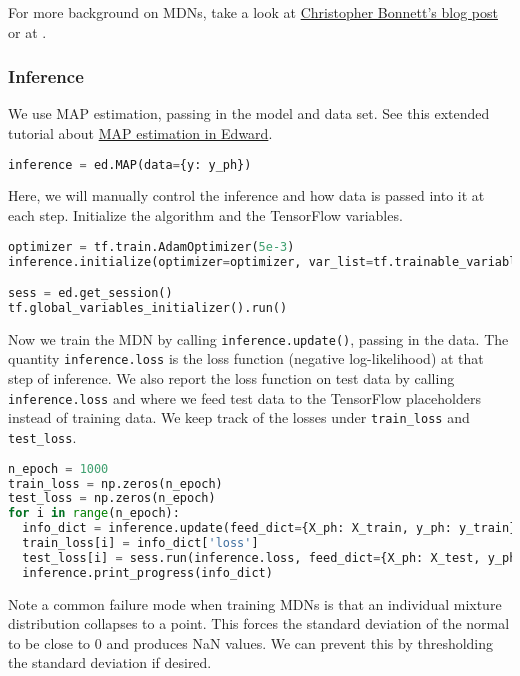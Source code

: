For more background on MDNs, take a look at
\href{http://cbonnett.github.io/MDN.html}{Christopher Bonnett's blog
post} or at \citet{bishop1994mixture}.

\subsubsection{Inference}

We use MAP estimation, passing in the model and data set.
See this extended tutorial about
\href{/tutorials/map}{MAP estimation in Edward}.

\begin{lstlisting}[language=Python]
inference = ed.MAP(data={y: y_ph})
\end{lstlisting}

Here, we will manually control the inference and how data is passed
into it at each step.
Initialize the algorithm and the TensorFlow variables.

\begin{lstlisting}[language=Python]
optimizer = tf.train.AdamOptimizer(5e-3)
inference.initialize(optimizer=optimizer, var_list=tf.trainable_variables())

sess = ed.get_session()
tf.global_variables_initializer().run()
\end{lstlisting}

Now we train the MDN by calling \texttt{inference.update()}, passing
in the data. The quantity \texttt{inference.loss} is the
loss function (negative log-likelihood) at that step of inference. We
also report the loss function on test data by calling
\texttt{inference.loss} and where we feed test data to the TensorFlow
placeholders instead of training data.
We keep track of the losses under \texttt{train\_loss} and \texttt{test\_loss}.

\begin{lstlisting}[language=Python]
n_epoch = 1000
train_loss = np.zeros(n_epoch)
test_loss = np.zeros(n_epoch)
for i in range(n_epoch):
  info_dict = inference.update(feed_dict={X_ph: X_train, y_ph: y_train})
  train_loss[i] = info_dict['loss']
  test_loss[i] = sess.run(inference.loss, feed_dict={X_ph: X_test, y_ph: y_test})
  inference.print_progress(info_dict)
\end{lstlisting}

Note a common failure mode when training MDNs is that an individual
mixture distribution collapses to a point. This forces the standard
deviation of the normal to be close to 0 and produces NaN values.
We can prevent this by thresholding the standard deviation if desired.

